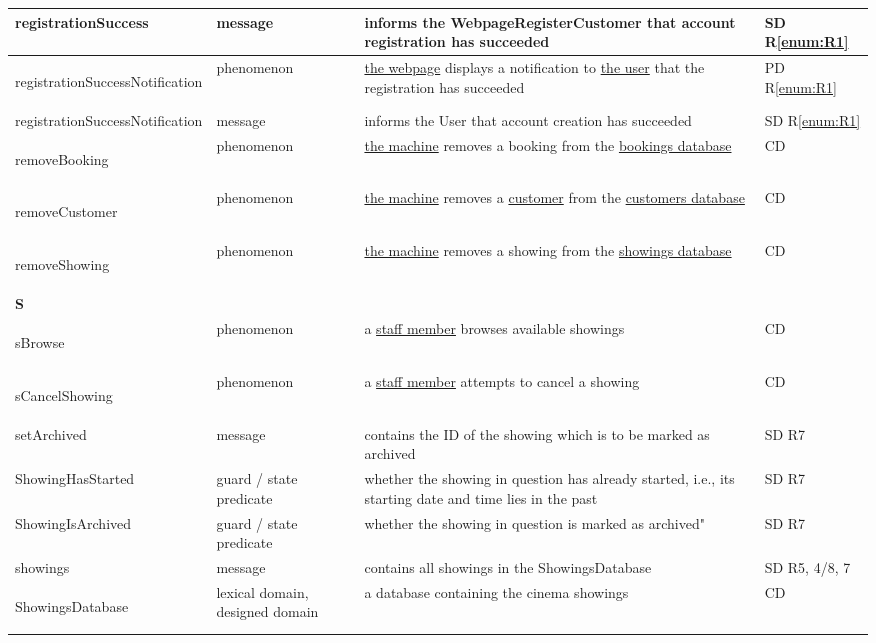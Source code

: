 \documentclass[a4paper,10pt,titlepage,bibtotoc,bibtotocnumbered]{scrreprt}
\begin{document}
\begin{longtable}{|l|p{3cm}|p{5cm}|l|}
\hline
registrationSuccess & message & informs the WebpageRegisterCustomer that account registration has succeeded & SD R\ref{enum:R1}\\
\hline
\hypertarget{glossary:registrationSuccessNotification}{registrationSuccessNotification} & phenomenon & \hyperlink{glossary:WebpageRegisterCustomer}{the webpage} displays a notification to \hyperlink{glossary:User}{the user} that the registration has succeeded & PD R\ref{enum:R1}\\
\hline
registrationSuccessNotification & message & informs the User that account creation has succeeded & SD R\ref{enum:R1}\\
\hline
\hypertarget{glossary:removeBooking}{removeBooking} & phenomenon &  \hyperlink{glossary:UDEKino}{the machine} removes a booking from the \hyperlink{glossary:BookingsDatabase}{bookings database} & CD\\
\hline
\hypertarget{glossary:removeBooking}{removeCustomer} & phenomenon &  \hyperlink{glossary:UDEKino}{the machine} removes a \hyperlink{glossary:Customer}{customer} from the \hyperlink{glossary:CustomersDatabase}{customers database} & CD\\
\hline
\hypertarget{glossary:Showing}{removeShowing} & phenomenon &  \hyperlink{glossary:UDEKino}{the machine} removes a showing from the \hyperlink{glossary:ShowingsDatabase}{showings database} & CD\\
\hline
\multicolumn{4}{|l|}{\textbf{S}}\\
\hline
\hypertarget{glossary:sBrowse}{sBrowse} & phenomenon & a \hyperlink{glossary:StaffMember}{staff member} browses available showings & CD\\
\hline
\hypertarget{glossary:sCancelShowing}{sCancelShowing} & phenomenon & a \hyperlink{glossary:StaffMember}{staff member} attempts to cancel a showing & CD\\
\hline
setArchived & message & contains the ID of the showing which is to be marked as archived & SD R7\\
\hline
ShowingHasStarted & guard / state predicate & whether the showing in question has already started, i.e., its starting date and time lies in the past & SD R7\\
\hline
ShowingIsArchived & guard / state predicate & whether the showing in question is marked as archived" & SD R7\\
\hline
showings & message & contains all showings in the ShowingsDatabase & SD R5, 4/8, 7\\
\hline
\hypertarget{glossary:ShowingsDatabase}{ShowingsDatabase} & lexical domain, designed domain & a database containing the cinema showings & CD\\

\end{longtable}
\end{document}
